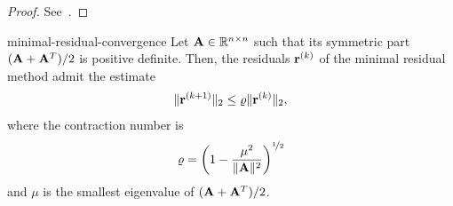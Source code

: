 \begin{proof}
  See~\cite[Theorem 5.9]{Saad00}.
\end{proof}

\begin{Theorem}{minimal-residual-convergence}
  Let $\mathbf A\in\mathbb R^{n\times n}$ such that its symmetric part $(\mathbf A+\mathbf A^T)/2$
  is positive definite. Then, the residuals $\mathbf r^{(k)}$ of the minimal
  residual method admit the estimate
  \begin{gather}
    \lVert\mathbf r^{(k+1)}\rVert_2 \le \varrho \lVert\mathbf r^{(k)}\rVert_2,
  \end{gather}
  where the contraction number is
  \begin{gather}
    \varrho = \left(1-\frac{\mu^2}{\lVert\mathbf A\rVert^2}\right)^{\nicefrac12}
  \end{gather}
  and $\mu$ is the smallest eigenvalue of $(\mathbf A+\mathbf A^T)/2$.
\end{Theorem}



